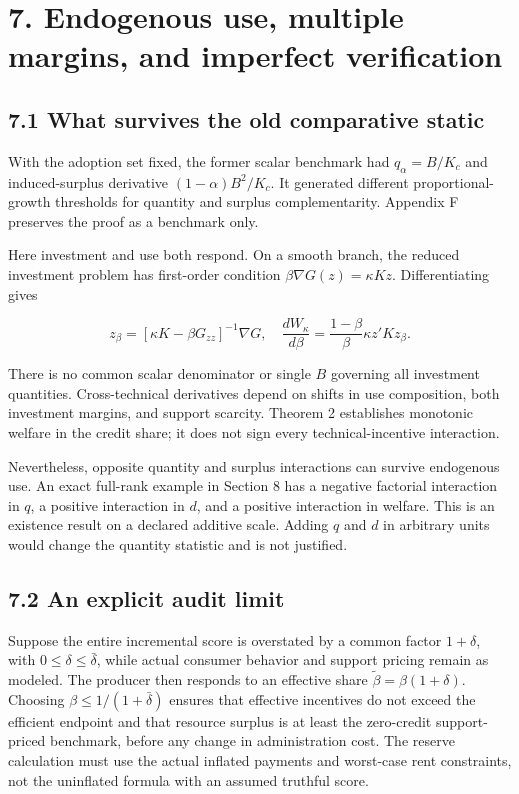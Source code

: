 \documentclass[
  11pt,
]{article}
\begin{document}
\section{7. Endogenous use, multiple margins, and imperfect
verification}\label{endogenous-use-multiple-margins-and-imperfect-verification}

\subsection{7.1 What survives the old comparative
static}\label{what-survives-the-old-comparative-static}

With the adoption set fixed, the former scalar benchmark had
\(q_\alpha=B/K_c\) and induced-surplus derivative \((1-\alpha)B^2/K_c\).
It generated different proportional-growth thresholds for quantity and
surplus complementarity. Appendix F preserves the proof as a benchmark
only.

Here investment and use both respond. On a smooth branch, the reduced
investment problem has first-order condition
\(\beta\nabla G(z)=\kappa Kz\). Differentiating gives

\[z_\beta=[\kappa K-\beta G_{zz}]^{-1}\nabla G,
\quad \frac{dW_\kappa}{d\beta}
=\frac{1-\beta}{\beta}\kappa z'Kz_\beta. \tag{27}\]

There is no common scalar denominator or single \(B\) governing all
investment quantities. Cross-technical derivatives depend on shifts in
use composition, both investment margins, and support scarcity. Theorem
2 establishes monotonic welfare in the credit share; it does not sign
every technical-incentive interaction.

Nevertheless, opposite quantity and surplus interactions can survive
endogenous use. An exact full-rank example in Section 8 has a negative
factorial interaction in \(q\), a positive interaction in \(d\), and a
positive interaction in welfare. This is an existence result on a
declared additive scale. Adding \(q\) and \(d\) in arbitrary units would
change the quantity statistic and is not justified.

\subsection{7.2 An explicit audit limit}\label{an-explicit-audit-limit}

Suppose the entire incremental score is overstated by a common factor
\(1+\delta\), with \(0\leq\delta\leq\bar\delta\), while actual consumer
behavior and support pricing remain as modeled. The producer then
responds to an effective share \(\widetilde\beta=\beta(1+\delta)\).
Choosing \(\beta\leq1/(1+\bar\delta)\) ensures that effective incentives
do not exceed the efficient endpoint and that resource surplus is at
least the zero-credit support-priced benchmark, before any change in
administration cost. The reserve calculation must use the actual
inflated payments and worst-case rent constraints, not the uninflated
formula with an assumed truthful score.
\end{document}
